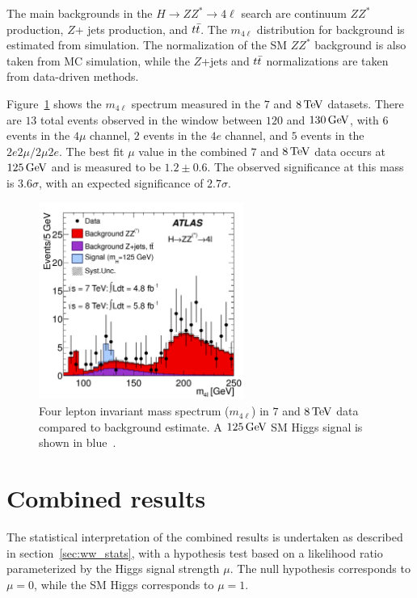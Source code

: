 The main backgrounds in the $H\to ZZ^* \to 4\ell$ search are continuum $ZZ^*$ production, $Z$+ jets production, and $t\bar{t}$. The $m_{4\ell}$ distribution for background is estimated from simulation. The normalization of the SM $ZZ^*$ background is also taken from MC simulation, while the $Z$+jets and $t\bar{t}$ normalizations are taken from data-driven methods.

Figure~\ref{fig:disc_zz_result} shows the $m_{4\ell}$ spectrum measured in the $7$ and $8 \TeV$ datasets. There are $13$ total events observed in the window between $120$ and $130 \GeV$, with $6$ events in the $4\mu$ channel, $2$ events in the $4e$ channel, and $5$ events in the $2e2\mu/2\mu2e$. The best fit $\mu$ value in the combined $7$ and $8 \TeV$ data occurs at $125 \GeV$ and is measured to be $1.2 \pm 0.6$. The observed significance at this mass is $3.6\sigma$, with an expected significance of $2.7\sigma$. 

\begin{figure}[h!]
  \centering
  \captionsetup{justification=centering}
  \includegraphics[width=0.6\textwidth]{figures/discovery_m4l}
  \caption{Four lepton invariant mass spectrum ($m_{4\ell}$) in $7$ and $8 \TeV$ data compared to background estimate. A $125 \GeV$ SM Higgs signal is shown in blue~\cite{Discovery}.}
  \label{fig:disc_zz_result}
\end{figure}

\section{Combined results}

The statistical interpretation of the combined results is undertaken as described in section~\ref{sec:ww_stats}, with a hypothesis test based on a likelihood ratio parameterized by the Higgs signal strength $\mu$. The null hypothesis corresponds to $\mu = 0$, while the SM Higgs corresponds to $\mu = 1$. 

